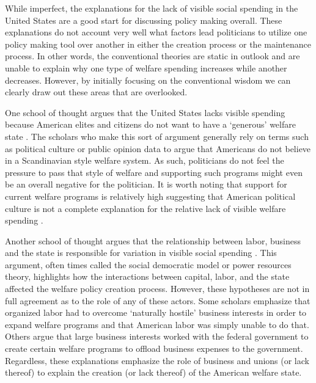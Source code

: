 \documentclass[12pt]{article}
\begin{document}
While imperfect, the explanations for the lack of visible social spending in the United States are a good start for discussing policy making overall. These explanations do not account very well what factors lead politicians to utilize one policy making tool over another in either the creation process or the maintenance process. In other words, the conventional theories are static in outlook and are unable to explain why one type of welfare spending increases while another decreases. However, by initially focusing on the conventional wisdom we can clearly draw out these areas that are overlooked.

One school of thought argues that the United States lacks visible spending because American elites and citizens do not want to have a `generous' welfare state \citep{king1973}. The scholars who make this sort of argument generally rely on terms such as political culture or public opinion data to argue that Americans do not believe in a Scandinavian style welfare system. As such, politicians do not feel the pressure to pass that style of welfare and supporting such programs might even be an overall negative for the politician. It is worth noting that support for current welfare programs is relatively high suggesting that American political culture is not a complete explanation for the relative lack of visible welfare spending \citep[Ch. 6]{howard2008}.

Another school of thought argues that the relationship between labor, business and the state is responsible for variation in visible social spending \citep{korpi1980, swenson2004}. This argument, often times called the social democratic model or power resources theory, highlights how the interactions between capital, labor, and the state affected the welfare policy creation process. However, these hypotheses are not in full agreement as to the role of any of these actors. Some scholars emphasize that organized labor had to overcome `naturally hostile' business interests in order to expand welfare programs and that American labor was simply unable to do that. Others argue that large business interests worked with the federal government to create certain welfare programs to offload business expenses to the government. Regardless, these explanations emphasize the role of business and unions (or lack thereof) to explain the creation (or lack thereof) of the American welfare state. 
\end{document}
